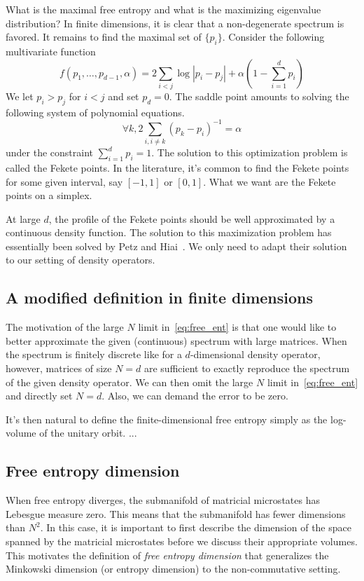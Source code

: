 \documentclass[11pt,letterpaper]{article}
\begin{document}
What is the maximal free entropy and what is the maximizing eigenvalue distribution? In finite dimensions, it is clear that a non-degenerate spectrum is favored. It remains to find the maximal set of $\{p_i\}$. Consider the following multivariate function
\begin{equation}
    f(p_1,\ldots,p_{d-1},\alpha) = 2\sum_{i<j}\log |p_i-p_j| + \alpha (1-\sum_{i=1}^d p_i)
\end{equation}
We let $p_i>p_j$ for $i<j$ and set $p_d=0$. The saddle point amounts to solving the following system of polynomial equations.
\begin{equation}
   \forall k, 2\sum_{i, i\neq k}(p_k-p_i)^{-1} = \alpha
\end{equation}
under the constraint $\sum_{i=1}^d p_i=1$. The solution to this optimization problem is called the Fekete points. In the literature, it's common to find the Fekete points for some given interval, say $[-1,1]$ or $[0,1]$. What we want are the Fekete points on a simplex. 

At large $d$,  the profile of the Fekete points should be well approximated by a continuous density function. The solution to this maximization problem has essentially been solved by Petz and Hiai~\cite{hiai1998maximizing}. We only need to adapt their solution to our setting of density operators.

\subsection{A modified definition in finite dimensions}
The motivation of the large $N$ limit in~\eqref{eq:free_ent} is that one would like to better approximate the given (continuous) spectrum with large matrices. When the spectrum is finitely discrete like for a $d$-dimensional density operator, however, matrices of size $N=d$ are sufficient to exactly reproduce the spectrum of the given density operator. We can then omit the large $N$ limit in~\eqref{eq:free_ent} and directly set $N=d$. Also, we can demand the error to be zero.

It's then natural to define the finite-dimensional free entropy simply as the log-volume of the unitary orbit. ...


\subsection{Free entropy dimension}\label{sec:fed}
When free entropy diverges, the submanifold of matricial microstates has Lebesgue measure zero. This means that the submanifold has fewer dimensions than $N^2$. In this case, it is important to first describe the dimension of the space spanned by the matricial microstates before we discuss their appropriate volumes. This motivates the definition of \emph{free entropy dimension} that generalizes the Minkowski dimension (or entropy dimension) to the non-commutative setting. 
\end{document}

